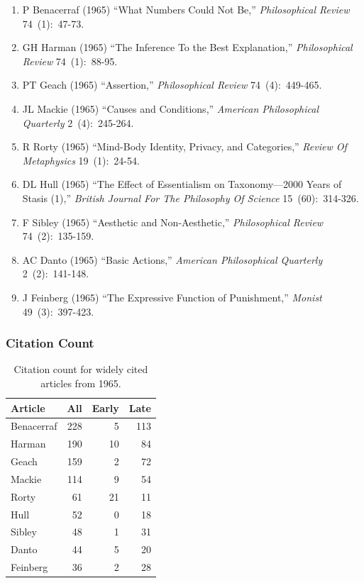 \documentclass[
  10pt,
  letterpaper,
  DIV=11,
  numbers=noendperiod,
  twoside]{scrartcl}
\providecommand{\tightlist}{%
  \setlength{\itemsep}{0pt}\setlength{\parskip}{0pt}}\usepackage{longtable,booktabs,array}
\begin{document}
\begin{enumerate}
\def\labelenumi{\arabic{enumi}.}
\tightlist
\item
  P Benacerraf (1965) ``What Numbers Could Not Be,'' \emph{Philosophical
  Review} 74~(1):~47-73.
\item
  GH Harman (1965) ``The Inference To the Best Explanation,''
  \emph{Philosophical Review} 74~(1):~88-95.
\item
  PT Geach (1965) ``Assertion,'' \emph{Philosophical Review}
  74~(4):~449-465.
\item
  JL Mackie (1965) ``Causes and Conditions,'' \emph{American
  Philosophical Quarterly} 2~(4):~245-264.
\item
  R Rorty (1965) ``Mind-Body Identity, Privacy, and Categories,''
  \emph{Review Of Metaphysics} 19~(1):~24-54.
\item
  DL Hull (1965) ``The Effect of Essentialism on Taxonomy---2000 Years
  of Stasis (1),'' \emph{British Journal For The Philosophy Of Science}
  15~(60):~314-326.
\item
  F Sibley (1965) ``Aesthetic and Non-Aesthetic,'' \emph{Philosophical
  Review} 74~(2):~135-159.
\item
  AC Danto (1965) ``Basic Actions,'' \emph{American Philosophical
  Quarterly} 2~(2):~141-148.
\item
  J Feinberg (1965) ``The Expressive Function of Punishment,''
  \emph{Monist} 49~(3):~397-423.
\end{enumerate}

\subsubsection*{Citation Count}\label{sec-count-1965}

\begin{longtable}[]{@{}lrrr@{}}

\caption{\label{tbl-citation-count-1965}Citation count for widely cited
articles from 1965.}

\tabularnewline

\toprule\noalign{}
Article & All & Early & Late \\
\midrule\noalign{}
\endhead
\bottomrule\noalign{}
\endlastfoot
Benacerraf & 228 & 5 & 113 \\
Harman & 190 & 10 & 84 \\
Geach & 159 & 2 & 72 \\
Mackie & 114 & 9 & 54 \\
Rorty & 61 & 21 & 11 \\
Hull & 52 & 0 & 18 \\
Sibley & 48 & 1 & 31 \\
Danto & 44 & 5 & 20 \\
Feinberg & 36 & 2 & 28 \\

\end{longtable}
\end{document}
